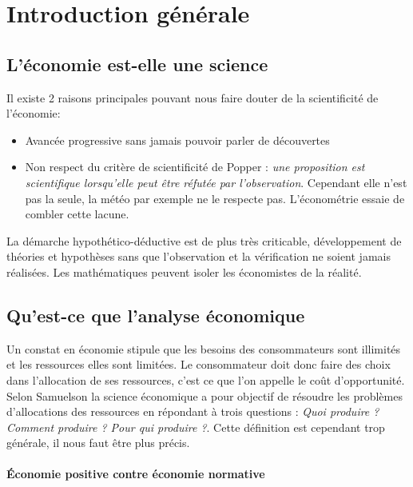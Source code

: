 \section{Introduction générale} %
\label{prt:introduction_generale}

\subsection{L'économie est-elle une science} %
\label{sec:l_economie_est_elle_une_science}
Il existe 2 raisons principales pouvant nous faire douter de la scientificité de l'économie:

\begin{itemize}[label=]
	\item Avancée progressive sans jamais pouvoir parler de découvertes	
	\item Non respect du critère de scientificité de Popper : \emph{une proposition est scientifique lorsqu'elle peut être réfutée par l'observation}. Cependant elle n'est pas la seule, la météo par exemple ne le respecte pas. L'économétrie essaie de combler cette lacune.
\end{itemize}

La démarche hypothético-déductive est de plus très criticable, développement de théories et hypothèses sans que l'observation et la vérification ne soient jamais réalisées. Les mathématiques peuvent isoler les économistes de la réalité.


\subsection{Qu'est-ce que l'analyse économique} %
\label{sec:qu_est_ce_que_l_analyse_economique}

Un constat en économie stipule que les besoins des consommateurs sont illimités et les ressources elles sont limitées. Le consommateur doit donc faire des choix dans l'allocation de ses ressources, c'est ce que l'on appelle le coût d'opportunité. Selon Samuelson la science économique a pour objectif de résoudre les problèmes d'allocations des ressources en répondant à trois questions : \emph{Quoi produire ? Comment produire ? Pour qui produire ?}. Cette définition est cependant trop générale, il nous faut être plus précis. 

\paragraph{Économie positive contre économie normative} %
\label{par:economie_positive_contre_economie_normative}


